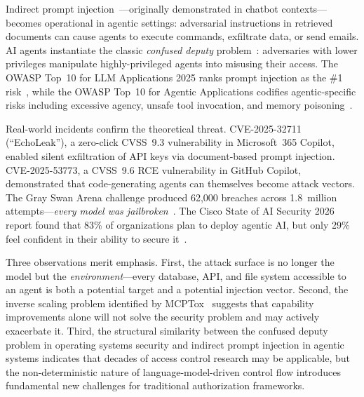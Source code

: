 Indirect prompt injection~\cite{greshake2023ipi}---originally demonstrated in chatbot contexts---becomes operational in agentic settings: adversarial instructions in retrieved documents can cause agents to execute commands, exfiltrate data, or send emails. AI agents instantiate the classic \emph{confused deputy} problem~\cite{hardy1988confused}: adversaries with lower privileges manipulate highly-privileged agents into misusing their access. The OWASP Top~10 for LLM Applications 2025 ranks prompt injection as the \#1 risk~\cite{owasp2025}, while the OWASP Top~10 for Agentic Applications codifies agentic-specific risks including excessive agency, unsafe tool invocation, and memory poisoning~\cite{owasp2025agentic}.

Real-world incidents confirm the theoretical threat. CVE-2025-32711 (``EchoLeak''), a zero-click CVSS~9.3 vulnerability in Microsoft~365 Copilot, enabled silent exfiltration of API keys via document-based prompt injection. CVE-2025-53773, a CVSS~9.6 RCE vulnerability in GitHub Copilot, demonstrated that code-generating agents can themselves become attack vectors. The Gray Swan Arena challenge produced 62,000 breaches across 1.8~million attempts---\emph{every model was jailbroken}~\cite{grayswan2025arena}. The Cisco State of AI Security 2026 report found that 83\% of organizations plan to deploy agentic AI, but only 29\% feel confident in their ability to secure it~\cite{cisco2026aisecurity}.

Three observations merit emphasis. First, the attack surface is no longer the model but the \emph{environment}---every database, API, and file system accessible to an agent is both a potential target and a potential injection vector. Second, the inverse scaling problem identified by MCPTox~\cite{wang2025mcptox} suggests that capability improvements alone will not solve the security problem and may actively exacerbate it. Third, the structural similarity between the confused deputy problem in operating systems security and indirect prompt injection in agentic systems indicates that decades of access control research may be applicable, but the non-deterministic nature of language-model-driven control flow introduces fundamental new challenges for traditional authorization frameworks.

